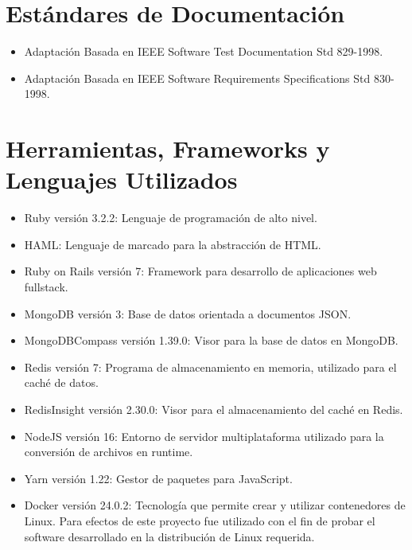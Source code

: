 \section{Estándares de Documentación}
\begin{itemize}
	\item Adaptación Basada en IEEE Software Test Documentation Std 829-1998.
	\item Adaptación Basada en IEEE Software Requirements Specifications Std 830-1998.
\end{itemize}

\section{Herramientas, Frameworks y  Lenguajes Utilizados}
\begin{itemize}
	\item Ruby versión 3.2.2: Lenguaje de programación de alto nivel.
	\item HAML: Lenguaje de marcado para la abstracción de HTML.
	\item Ruby on Rails versión 7: Framework para desarrollo de aplicaciones web fullstack.
	\item MongoDB versión 3: Base de datos orientada a documentos JSON.
	\item MongoDBCompass versión 1.39.0: Visor para la base de datos en MongoDB.
	\item Redis versión 7: Programa de almacenamiento en memoria, utilizado para el caché de datos.
	\item RedisInsight versión 2.30.0: Visor para el almacenamiento del caché en Redis.
	\item NodeJS versión 16: Entorno de servidor multiplataforma utilizado para la conversión de archivos en runtime.
	\item Yarn versión 1.22: Gestor de paquetes para JavaScript.
	\item Docker versión 24.0.2: Tecnología que permite crear y utilizar contenedores de Linux. Para efectos de este proyecto fue utilizado con el fin de probar el software desarrollado en la distribución de Linux requerida.
\end{itemize}
